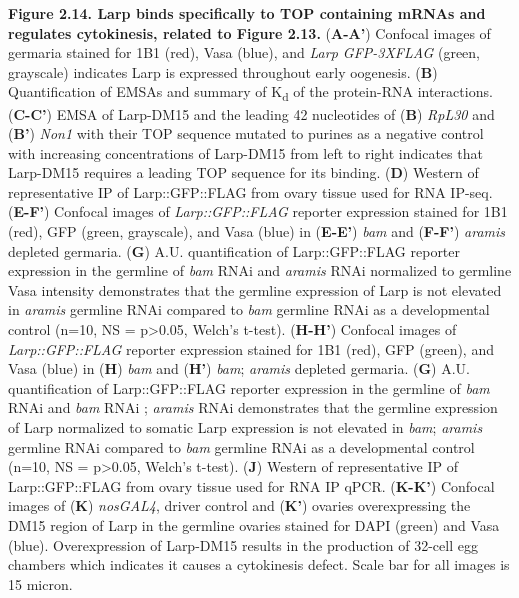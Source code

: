 \documentclass[12pt,oneside]{reedthesis}
\begin{document}
\textbf{\hfill\break
}

\textbf{Figure 2.14. Larp binds specifically to TOP containing mRNAs
and regulates cytokinesis, related to Figure 2.13.} (\textbf{A-A'}) Confocal
images of germaria stained for 1B1 (red), Vasa (blue), and \emph{Larp
GFP-3XFLAG} (green, grayscale) indicates Larp is expressed throughout
early oogenesis. (\textbf{B}) Quantification of EMSAs and summary of K\textsubscript{d} of
the protein-RNA interactions. (\textbf{C-C'}) EMSA of Larp-DM15 and the
leading 42 nucleotides of (\textbf{B}) \emph{RpL30} and (\textbf{B'}) \emph{Non1} with their
TOP sequence mutated to purines as a negative control with increasing
concentrations of Larp-DM15 from left to right indicates that Larp-DM15
requires a leading TOP sequence for its binding. (\textbf{D}) Western of
representative IP of Larp::GFP::FLAG from ovary tissue used for RNA
IP-seq. (\textbf{E-F'}) Confocal images of \emph{Larp::GFP::FLAG} reporter
expression stained for 1B1 (red), GFP (green, grayscale), and Vasa
(blue) in (\textbf{E-E'}) \emph{bam} and (\textbf{F-F'}) \emph{aramis} depleted germaria.
(\textbf{G}) A.U. quantification of Larp::GFP::FLAG reporter expression in
the germline of \emph{bam} RNAi and \emph{aramis} RNAi normalized to germline Vasa
intensity demonstrates that the germline expression of Larp is not
elevated in \emph{aramis} germline RNAi compared to \emph{bam} germline RNAi as a
developmental control (n=10, NS = p\textgreater0.05, Welch's t-test). (\textbf{H-H'})
Confocal images of \emph{Larp::GFP::FLAG} reporter expression stained for 1B1
(red), GFP (green), and Vasa (blue) in (\textbf{H}) \emph{bam} and (\textbf{H'}) \emph{bam};
\emph{aramis} depleted germaria. (\textbf{G}) A.U. quantification of
Larp::GFP::FLAG reporter expression in the germline of \emph{bam} RNAi and
\emph{bam} RNAi ; \emph{aramis} RNAi demonstrates that the germline expression of
Larp normalized to somatic Larp expression is not elevated in \emph{bam};
\emph{aramis} germline RNAi compared to \emph{bam} germline RNAi as a
developmental control (n=10, NS = p\textgreater0.05, Welch's t-test). (\textbf{J})
Western of representative IP of Larp::GFP::FLAG from ovary tissue used
for RNA IP qPCR. (\textbf{K-K'}) Confocal images of (\textbf{K}) \emph{nosGAL4}, driver
control and (\textbf{K'}) ovaries overexpressing the DM15 region of Larp in
the germline ovaries stained for DAPI (green) and Vasa (blue).
Overexpression of Larp-DM15 results in the production of 32-cell egg
chambers which indicates it causes a cytokinesis defect. Scale bar for
all images is 15 micron.
\end{document}
